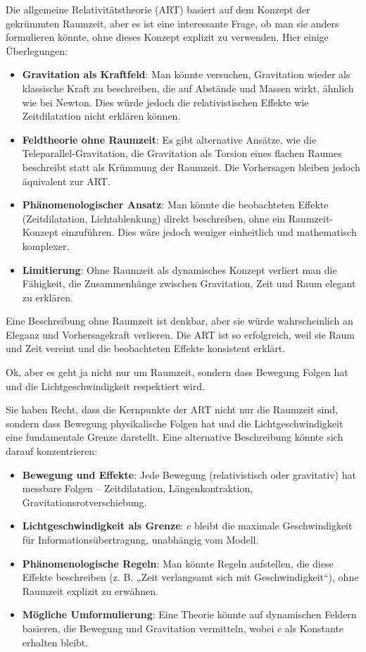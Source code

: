 \documentclass[a4paper,12pt]{article}
\begin{document}
Die allgemeine Relativitätstheorie (ART) basiert auf dem Konzept der gekrümmten Raumzeit, aber es ist eine interessante Frage, ob man sie anders formulieren könnte, ohne dieses Konzept explizit zu verwenden. Hier einige Überlegungen:

\begin{itemize}
	\item \textbf{Gravitation als Kraftfeld}: Man könnte versuchen, Gravitation wieder als klassische Kraft zu beschreiben, die auf Abstände und Massen wirkt, ähnlich wie bei Newton. Dies würde jedoch die relativistischen Effekte wie Zeitdilatation nicht erklären können.
	\item \textbf{Feldtheorie ohne Raumzeit}: Es gibt alternative Ansätze, wie die Teleparallel-Gravitation, die Gravitation als Torsion eines flachen Raumes beschreibt statt als Krümmung der Raumzeit. Die Vorhersagen bleiben jedoch äquivalent zur ART.
	\item \textbf{Phänomenologischer Ansatz}: Man könnte die beobachteten Effekte (Zeitdilatation, Lichtablenkung) direkt beschreiben, ohne ein Raumzeit-Konzept einzuführen. Dies wäre jedoch weniger einheitlich und mathematisch komplexer.
	\item \textbf{Limitierung}: Ohne Raumzeit als dynamisches Konzept verliert man die Fähigkeit, die Zusammenhänge zwischen Gravitation, Zeit und Raum elegant zu erklären.
\end{itemize}

Eine Beschreibung ohne Raumzeit ist denkbar, aber sie würde wahrscheinlich an Eleganz und Vorhersagekraft verlieren. Die ART ist so erfolgreich, weil sie Raum und Zeit vereint und die beobachteten Effekte konsistent erklärt.

Ok, aber es geht ja nicht nur um Raumzeit, sondern dass Bewegung Folgen hat und die Lichtgeschwindigkeit respektiert wird.

Sie haben Recht, dass die Kernpunkte der ART nicht nur die Raumzeit sind, sondern dass Bewegung physikalische Folgen hat und die Lichtgeschwindigkeit eine fundamentale Grenze darstellt. Eine alternative Beschreibung könnte sich darauf konzentrieren:

\begin{itemize}
	\item \textbf{Bewegung und Effekte}: Jede Bewegung (relativistisch oder gravitativ) hat messbare Folgen – Zeitdilatation, Längenkontraktion, Gravitationsrotverschiebung.
	\item \textbf{Lichtgeschwindigkeit als Grenze}: \( c \) bleibt die maximale Geschwindigkeit für Informationsübertragung, unabhängig vom Modell.
	\item \textbf{Phänomenologische Regeln}: Man könnte Regeln aufstellen, die diese Effekte beschreiben (z. B. „Zeit verlangsamt sich mit Geschwindigkeit“), ohne Raumzeit explizit zu erwähnen.
	\item \textbf{Mögliche Umformulierung}: Eine Theorie könnte auf dynamischen Feldern basieren, die Bewegung und Gravitation vermitteln, wobei \( c \) als Konstante erhalten bleibt.
\end{itemize}
\end{document}
